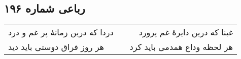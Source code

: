 \begin{center}
\section*{رباعی شماره ۱۹۶}
\label{sec:sh196}
\begin{longtable}{l p{0.5cm} r}
دردا که درین زمانهٔ پر غم و درد
&&
غبنا که درین دایرهٔ غم پرورد
\\
هر روز فراق دوستی باید دید
&&
هر لحظه وداع همدمی باید کرد
\\
\end{longtable}
\end{center}
